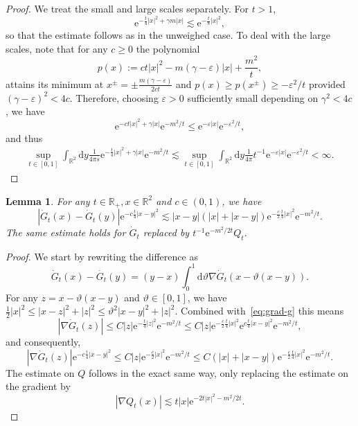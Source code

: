 \documentclass[11pt, a4paper]{scrartcl}
\numberwithin{equation}{section}
\theoremstyle{plain}
\newtheorem{lemma}[foo]{Lemma}
\theoremstyle{remark}
\newcommand{\assign}{:=}
\newcommand{\mathd}{\mathrm{d}}
\newcommand{\mathe}{\mathrm{e}}
\begin{document}
\begin{proof}
	We treat the small and large scales separately. For $t > 1$,
	\[ \mathe^{- \frac{t}{4} | x |^2 + \gamma m | x |} \lesssim \mathe^{-
			\frac{t}{8} | x |^2}, \]
	so that the estimate follows as in the unweighed case. To deal with the
	large scales, note that for any $c \geqslant 0$ the polynomial
	\[ p (x) \assign ct | x |^2 - m (\gamma - \varepsilon) | x | +
		\frac{m^2}{t}, \]
	attains its minimum at $x^{\pm} = \pm \frac{m (\gamma - \varepsilon)}{2
			ct}$ and $p (x) \geqslant p (x^{\pm}) \geqslant - \varepsilon^2 / t$
	provided $(\gamma - \varepsilon)^2 < 4 c$. Therefore, choosing $\varepsilon
		> 0$ sufficiently small depending on $\gamma^2 < 4 c$, we have \[\mathe^{- ct
			| x |^2 + \gamma | x |} \mathe^{- m^2 / t} \leqslant \mathe^{- \varepsilon |
			x |} \mathe^{- \varepsilon^2 / t},\] and thus
	\[ \begin{aligned}
			\sup_{t \in [0, 1]}  \int_{\mathbb{R}^2} \mathd y \frac{1}{4 \pi s}
			\mathe^{- \frac{t}{4} | x |^2 + \gamma | x |} \mathe^{- m^2 / t}
			\lesssim \sup_{t \in [0, 1]}  \int_{\mathbb{R}^2} \mathd y \frac{1}{4
				\pi} t^{- 1} \mathe^{- \varepsilon | x |} \mathe^{- \varepsilon^2 / t}
			< \infty .
		\end{aligned} \]
\end{proof}

\begin{lemma}
	\label{lem:hk-weighted-Lipschitz}For any $t \in \mathbb{R}_+, x \in
		\mathbb{R}^2$ and $c \in (0,1)$, we have
	\[ | \dot{G}_t (x) - \dot{G}_t (y) | \mathe^{- c \frac{t}{4}| x - y |^2} \lesssim | x -
		y | (| x | + | x - y |) \mathe^{- \frac{c}{2} \frac{t}{4}| x |^2} \mathe^{- m^2 / t}
		. \]
	The same estimate holds for $\dot{G}_t$ replaced by $t^{- 1} \mathe^{- m^2 /
			2 t} Q_t$.
\end{lemma}

\begin{proof}
	We start by rewriting the difference as
	\[ \dot{G}_t (x) - \dot{G_t} (y) = (y - x)  \int_0^1 \mathd \vartheta \nabla
		\dot{G}_t (x - \vartheta (x - y)) . \]
	For any $z = x - \vartheta (x - y)$ and $\vartheta \in [0, 1]$, we have
	$\frac{1}{2} | x |^2 \leqslant | x - z |^2 + | z |^2 \leqslant \vartheta^2 |
		x - y |^2 + | z |^2$. Combined with~\eqref{eq:grad-g} this means
	\[ | \nabla \dot{G}_t (z) | \leqslant C | z | \mathe^{- \frac{t}{4}| z |^2} \mathe^{-
			m^2 / t} \leqslant C | z | \mathe^{- \frac{c}{2}  \frac{t}{4}| x |^2} \mathe^{c \frac{t}{4}| x -
			y |^2} \mathe^{- m^2 / t}, \]
	and consequently,
	\[ | \nabla \dot{G}_t (z) | \mathe^{- c \frac{t}{4} | x - y |^2} \leqslant C | z |
		\mathe^{- \frac{c}{2} | x |^2} \mathe^{- m^2 / t} \leqslant C (| x | + |
		x - y |) \mathe^{- \frac{c}{2} \frac{t}{4}| x |^2} \mathe^{- m^2 / t} . \]
	The estimate on $Q$ follows in the exact same way, only replacing the
	estimate on the gradient by
	\[ | \nabla Q_t (x) | \lesssim t | x | \mathe^{- 2 t | x |^2 - m^2 / 2 t} .
	\]
\end{proof}
\end{document}

